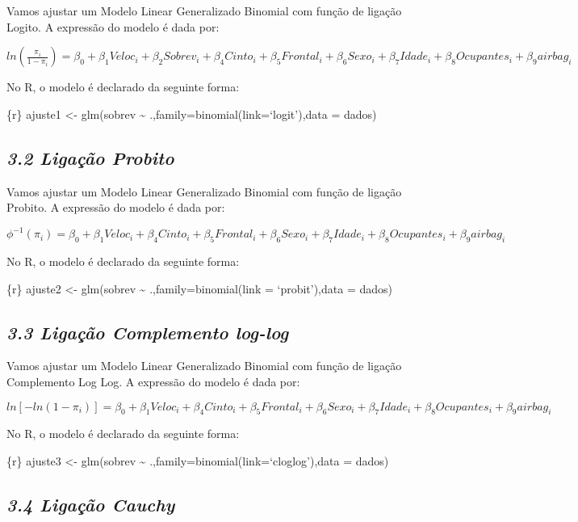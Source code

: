\documentclass[]{article}
\begin{document}
Vamos ajustar um Modelo Linear Generalizado Binomial com função de
ligação Logito. A expressão do modelo é dada por:

\(ln (\frac{\pi_i}{1-\pi_i}) = \beta_0 + \beta_1 Veloc_i + \beta_2 Sobrev_i+ \beta_4 Cinto_i + \beta_5 Frontal_i + \beta_6 Sexo_i + \beta_7 Idade_i + \beta_8 Ocupantes_i + \beta_9 airbag_i\)

No R, o modelo é declarado da seguinte forma:

\{r\} ajuste1 \textless{}- glm(sobrev \textasciitilde{}
.,family=binomial(link=`logit'),data = dados)

\subsection{\texorpdfstring{\emph{3.2 Ligação
Probito}}{3.2 Ligação Probito}}\label{ligacao-probito}

Vamos ajustar um Modelo Linear Generalizado Binomial com função de
ligação Probito. A expressão do modelo é dada por:

\(\phi^{-1} (\pi_i) = \beta_0 + \beta_1 Veloc_i + \beta_4 Cinto_i + \beta_5 Frontal_i + \beta_6 Sexo_i + \beta_7 Idade_i + \beta_8 Ocupantes_i + \beta_9 airbag_i\)

No R, o modelo é declarado da seguinte forma:

\{r\} ajuste2 \textless{}- glm(sobrev \textasciitilde{}
.,family=binomial(link = `probit'),data = dados)

\subsection{\texorpdfstring{\emph{3.3 Ligação Complemento
log-log}}{3.3 Ligação Complemento log-log}}\label{ligacao-complemento-log-log}

Vamos ajustar um Modelo Linear Generalizado Binomial com função de
ligação Complemento Log Log. A expressão do modelo é dada por:

\(ln[-ln(1-\pi_i)] = \beta_0 + \beta_1 Veloc_i + \beta_4 Cinto_i + \beta_5 Frontal_i + \beta_6 Sexo_i + \beta_7 Idade_i + \beta_8 Ocupantes_i + \beta_9 airbag_i\)

No R, o modelo é declarado da seguinte forma:

\{r\} ajuste3 \textless{}- glm(sobrev \textasciitilde{}
.,family=binomial(link=`cloglog'),data = dados)

\subsection{\texorpdfstring{\emph{3.4 Ligação
Cauchy}}{3.4 Ligação Cauchy}}\label{ligacao-cauchy}
\end{document}
